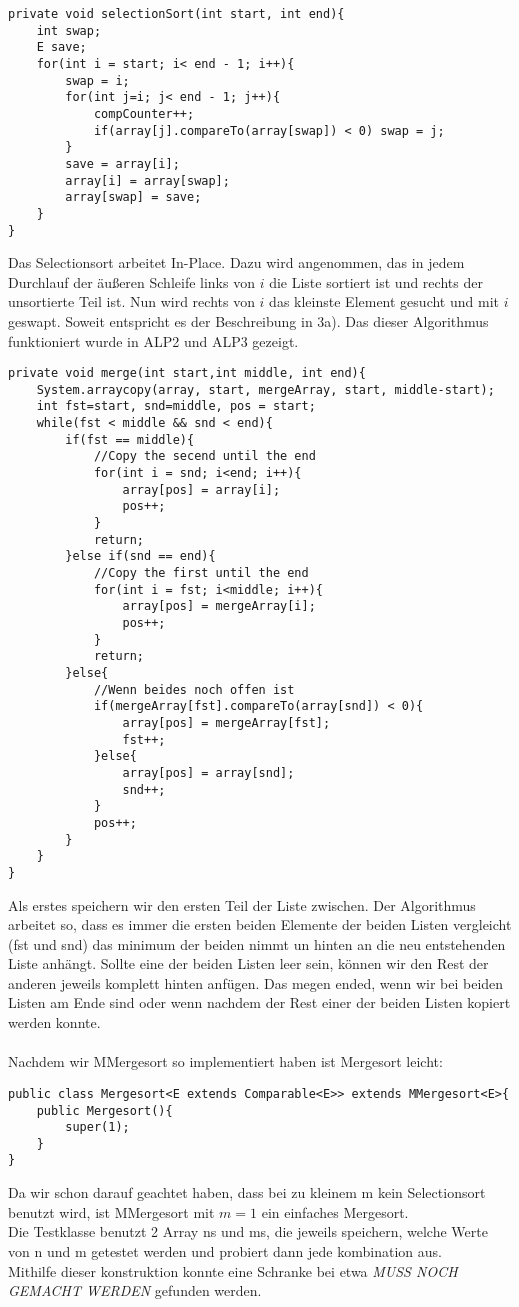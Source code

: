 \documentclass[11pt,a4paper,ngerman]{article}
\begin{document}
\begin{lstlisting}
private void selectionSort(int start, int end){
	int swap;
	E save;
	for(int i = start; i< end - 1; i++){
		swap = i;
		for(int j=i; j< end - 1; j++){
			compCounter++;
			if(array[j].compareTo(array[swap]) < 0) swap = j;
		}
		save = array[i];
		array[i] = array[swap];
		array[swap] = save;
	}
}
\end{lstlisting}
Das Selectionsort arbeitet In-Place. Dazu wird angenommen, das in jedem Durchlauf der äußeren Schleife links von $i$ die Liste sortiert ist und rechts der unsortierte Teil ist. Nun wird rechts von $i$ das kleinste Element gesucht und mit $i$ geswapt. Soweit entspricht es der Beschreibung in 3a). Das dieser Algorithmus funktioniert wurde in ALP2 und ALP3 gezeigt.\\

\begin{lstlisting}
private void merge(int start,int middle, int end){
	System.arraycopy(array, start, mergeArray, start, middle-start);
	int fst=start, snd=middle, pos = start;
	while(fst < middle && snd < end){
		if(fst == middle){
			//Copy the secend until the end
			for(int i = snd; i<end; i++){
				array[pos] = array[i];
				pos++;
			}
			return; 
		}else if(snd == end){
			//Copy the first until the end
			for(int i = fst; i<middle; i++){
				array[pos] = mergeArray[i];
				pos++;
			}	
			return; 
		}else{
			//Wenn beides noch offen ist
			if(mergeArray[fst].compareTo(array[snd]) < 0){
				array[pos] = mergeArray[fst];
				fst++;
			}else{
				array[pos] = array[snd];
				snd++;
			}
			pos++;
		}
	}
}
\end{lstlisting}
Als erstes speichern wir den ersten Teil der Liste zwischen. Der Algorithmus arbeitet so, dass es immer die ersten beiden Elemente der beiden Listen vergleicht (fst und snd) das minimum der beiden nimmt un hinten an die neu entstehenden Liste anhängt. Sollte eine der beiden Listen leer sein, können wir den Rest der anderen jeweils komplett hinten anfügen. Das megen ended, wenn wir bei beiden Listen am Ende sind oder wenn nachdem der Rest einer der beiden Listen kopiert werden konnte.\\
\vspace{\baselineskip}\\
Nachdem wir MMergesort so implementiert haben ist Mergesort leicht:
\begin{lstlisting}
public class Mergesort<E extends Comparable<E>> extends MMergesort<E>{	
	public Mergesort(){
		super(1);
	}
}
\end{lstlisting}
Da wir schon darauf geachtet haben, dass bei zu kleinem m kein Selectionsort benutzt wird, ist MMergesort mit $m=1$ ein einfaches Mergesort.\\
Die Testklasse benutzt 2 Array ns und ms, die jeweils speichern, welche Werte von n und m getestet werden und probiert dann jede kombination aus.\\
Mithilfe dieser konstruktion konnte eine Schranke bei etwa \emph{MUSS NOCH GEMACHT WERDEN} gefunden werden.

\label{LastPage}
\end{document}
